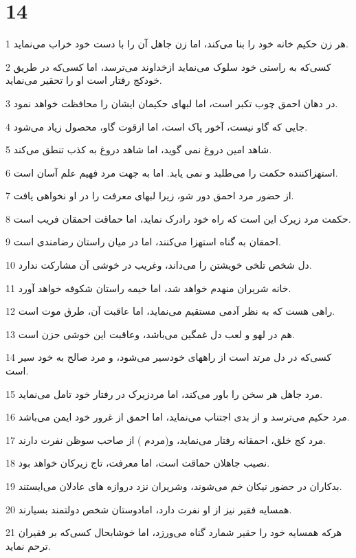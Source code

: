 \chapter{14}

\par 1 هر زن حکیم خانه خود را بنا می‌کند، اما زن جاهل آن را با دست خود خراب می‌نماید.
\par 2 کسی‌که به راستی خود سلوک می‌نماید ازخداوند می‌ترسد، اما کسی‌که در طریق خودکج رفتار است او را تحقیر می‌نماید.
\par 3 در دهان احمق چوب تکبر است، اما لبهای حکیمان ایشان را محافظت خواهد نمود.
\par 4 جایی که گاو نیست، آخور پاک است، اما ازقوت گاو، محصول زیاد می‌شود.
\par 5 شاهد امین دروغ نمی گوید، اما شاهد دروغ به کذب تنطق می‌کند.
\par 6 استهزاکننده حکمت را می‌طلبد و نمی یابد. اما به جهت مرد فهیم علم آسان است.
\par 7 از حضور مرد احمق دور شو، زیرا لبهای معرفت را در او نخواهی یافت.
\par 8 حکمت مرد زیرک این است که راه خود رادرک نماید، اما حماقت احمقان فریب است.
\par 9 احمقان به گناه استهزا می‌کنند، اما در میان راستان رضامندی است.
\par 10 دل شخص تلخی خویشتن را می‌داند، وغریب در خوشی آن مشارکت ندارد.
\par 11 خانه شریران منهدم خواهد شد، اما خیمه راستان شکوفه خواهد آورد.
\par 12 راهی هست که به نظر آدمی مستقیم می‌نماید، اما عاقبت آن، طرق موت است.
\par 13 هم در لهو و لعب دل غمگین می‌باشد، وعاقبت این خوشی حزن است.
\par 14 کسی‌که در دل مرتد است از راههای خودسیر می‌شود، و مرد صالح به خود سیر است.
\par 15 مرد جاهل هر سخن را باور می‌کند، اما مردزیرک در رفتار خود تامل می‌نماید.
\par 16 مرد حکیم می‌ترسد و از بدی اجتناب می‌نماید، اما احمق از غرور خود ایمن می‌باشد.
\par 17 مرد کج خلق، احمقانه رفتار می‌نماید، و(مردم ) از صاحب سوظن نفرت دارند.
\par 18 نصیب جاهلان حماقت است، اما معرفت، تاج زیرکان خواهد بود.
\par 19 بدکاران در حضور نیکان خم می‌شوند، وشریران نزد دروازه های عادلان می‌ایستند.
\par 20 همسایه فقیر نیز از او نفرت دارد، امادوستان شخص دولتمند بسیارند.
\par 21 هر‌که همسایه خود را حقیر شمارد گناه می‌ورزد، اما خوشابحال کسی‌که بر فقیران ترحم نماید.
